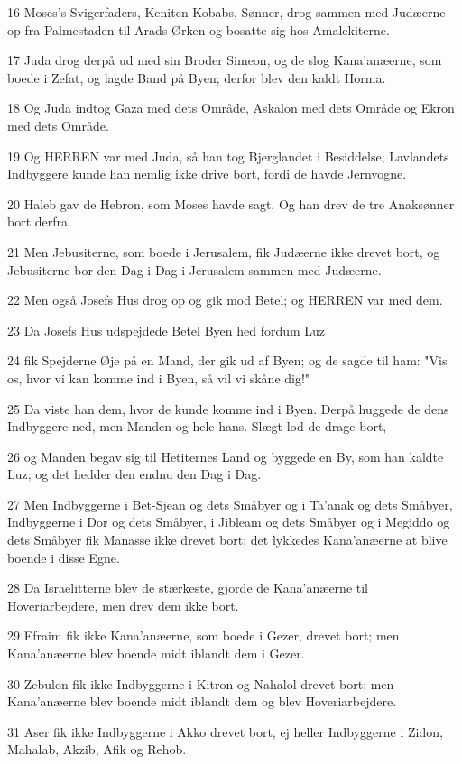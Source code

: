 \par 16 Moses's Svigerfaders, Keniten Kobabs, Sønner, drog sammen med Judæerne op fra Palmestaden til Arads Ørken og bosatte sig hos Amalekiterne.
\par 17 Juda drog derpå ud med sin Broder Simeon, og de slog Kana'anæerne, som boede i Zefat, og lagde Band på Byen; derfor blev den kaldt Horma.
\par 18 Og Juda indtog Gaza med dets Område, Askalon med dets Område og Ekron med dets Område.
\par 19 Og HERREN var med Juda, så han tog Bjerglandet i Besiddelse; Lavlandets Indbyggere kunde han nemlig ikke drive bort, fordi de havde Jernvogne.
\par 20 Haleb gav de Hebron, som Moses havde sagt. Og han drev de tre Anaksønner bort derfra.
\par 21 Men Jebusiterne, som boede i Jerusalem, fik Judæerne ikke drevet bort, og Jebusiterne bor den Dag i Dag i Jerusalem sammen med Judæerne.
\par 22 Men også Josefs Hus drog op og gik mod Betel; og HERREN var med dem.
\par 23 Da Josefs Hus udspejdede Betel Byen hed fordum Luz
\par 24 fik Spejderne Øje på en Mand, der gik ud af Byen; og de sagde til ham: "Vis os, hvor vi kan komme ind i Byen, så vil vi skåne dig!"
\par 25 Da viste han dem, hvor de kunde komme ind i Byen. Derpå huggede de dens Indbyggere ned, men Manden og hele hans. Slægt lod de drage bort,
\par 26 og Manden begav sig til Hetiternes Land og byggede en By, som han kaldte Luz; og det hedder den endnu den Dag i Dag.
\par 27 Men Indbyggerne i Bet-Sjean og dets Småbyer og i Ta'anak og dets Småbyer, Indbyggerne i Dor og dets Småbyer, i Jibleam og dets Småbyer og i Megiddo og dets Småbyer fik Manasse ikke drevet bort; det lykkedes Kana'anæerne at blive boende i disse Egne.
\par 28 Da Israelitterne blev de stærkeste, gjorde de Kana'anæerne til Hoveriarbejdere, men drev dem ikke bort.
\par 29 Efraim fik ikke Kana'anæerne, som boede i Gezer, drevet bort; men Kana'anæerne blev boende midt iblandt dem i Gezer.
\par 30 Zebulon fik ikke Indbyggerne i Kitron og Nahalol drevet bort; men Kana'anæerne blev boende midt iblandt dem og blev Hoveriarbejdere.
\par 31 Aser fik ikke Indbyggerne i Akko drevet bort, ej heller Indbyggerne i Zidon, Mahalab, Akzib, Afik og Rehob.
